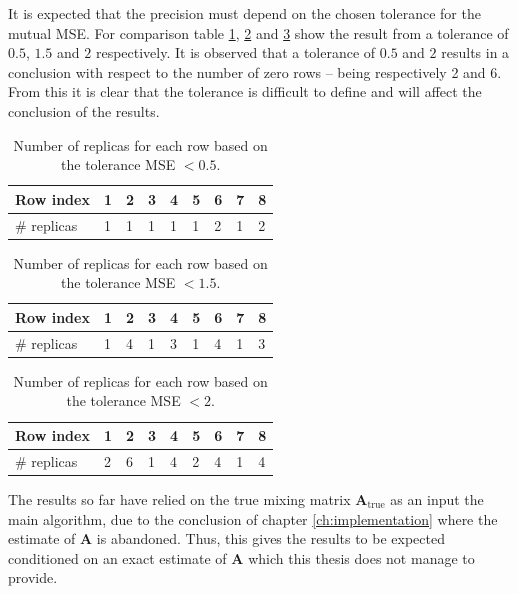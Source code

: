 \noindent
It is expected that the precision must depend on the chosen tolerance for the mutual MSE. 
For comparison table \ref{tab:replica2}, \ref{tab:replica3} and \ref{tab:replica4} show the result from a tolerance of $0.5$, $1.5$ and $2$ respectively. 
It is observed that a tolerance of $0.5$ and $2$ results in a conclusion with respect to the number of zero rows -- being respectively 2 and 6. 
From this it is clear that the tolerance is difficult to define and will affect the conclusion of the results.  
\begin{table}[H]
\center
\begin{tabular}{|l|l|l|l|l|l|l|l|l|}
\hline
Row index   & 1 & 2 & 3 & 4 & 5 & 6 & 7 & 8 \\ \hline
\# replicas & 1 & 1 & 1 & 1 & 1 & 2 & 1 & 2 \\ \hline
\end{tabular}
\caption{Number of replicas for each row based on the tolerance MSE $< 0.5$.}
\label{tab:replica2}
\end{table}
\noindent
\begin{table}[H]
\center
\begin{tabular}{|l|l|l|l|l|l|l|l|l|}
\hline
Row index   & 1 & 2 & 3 & 4 & 5 & 6 & 7 & 8 \\ \hline
\# replicas & 1 & 4 & 1 & 3 & 1 & 4 & 1 & 3 \\ \hline
\end{tabular}
\caption{Number of replicas for each row based on the tolerance MSE $< 1.5$.}
\label{tab:replica3}
\end{table}
\noindent
\begin{table}[H]
\center
\begin{tabular}{|l|l|l|l|l|l|l|l|l|}
\hline
Row index   & 1 & 2 & 3 & 4 & 5 & 6 & 7 & 8 \\ \hline
\# replicas & 2 & 6 & 1 & 4 & 2 & 4 & 1 & 4 \\ \hline
\end{tabular}
\caption{Number of replicas for each row based on the tolerance MSE $< 2$.}
\label{tab:replica4}
\end{table}
\noindent
The results so far have relied on the true mixing matrix $\mathbf{A}_{\text{true}}$ as an input the main algorithm, due to the conclusion of chapter \ref{ch:implementation} where the estimate of $\mathbf{A}$ is abandoned. 
Thus, this gives the results to be expected conditioned on an exact estimate of $\mathbf{A}$ which this thesis does not manage to provide.

